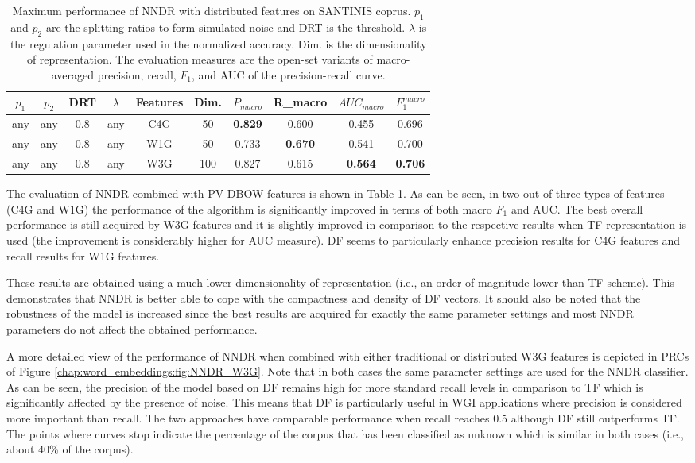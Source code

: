 \begin{table}
\center
\begin{tabular}{cccccccccc}
\hline
$p_{1}$ & $p_{2}$ & DRT & $\lambda$ & Features & Dim. & $P_{macro}$ & R_{macro} & $AUC_{macro}$ & $F_1^{macro}$ \\
\hline
any & any & 0.8 & any & C4G & 50 & \textbf{0.829} & 0.600 & 0.455 & 0.696 \\
any & any & 0.8 & any & W1G & 50 & 0.733 & \textbf{0.670} & 0.541 & 0.700 \\
any & any & 0.8 & any & W3G & 100 & 0.827 & 0.615 & \textbf{0.564} & \textbf{0.706} \\
\hline
\end{tabular}
\caption {Maximum performance of NNDR with distributed features on SANTINIS coprus. $p_{1}$ and $p_{2}$ are the splitting ratios to form simulated noise and DRT is the threshold. $\lambda$ is the regulation parameter used in the normalized accuracy. Dim. is the dimensionality of representation. The evaluation measures are the open-set variants of macro-averaged precision, recall, $F_1$, and AUC of the precision-recall curve.}
\label{chap:word_embeddings:tbl:NNDR_PVBOW}
\end{table}

The evaluation of NNDR combined with PV-DBOW features is shown in Table \ref{chap:word_embeddings:tbl:NNDR_PVBOW}. As can be seen, in two out of three types of features (C4G and W1G) the performance of the algorithm is significantly improved in terms of both macro $F_{1}$ and AUC. The best overall performance is still acquired by W3G features and it is slightly improved in comparison to the respective results when TF representation is used (the improvement is considerably higher for AUC measure). DF seems to particularly enhance precision results for C4G features and recall results for W1G features. 

These results are obtained using a much lower dimensionality of representation (i.e., an order of magnitude lower than TF scheme). This demonstrates that NNDR is better able to cope with the compactness and density of DF vectors. It should also be noted that the robustness of the model is increased since the best results are acquired for exactly the same parameter settings and most NNDR parameters do not affect the obtained performance. 

A more detailed view of the performance of NNDR when combined with either traditional or distributed W3G features is depicted in PRCs of Figure  \ref{chap:word_embeddings:fig:NNDR_W3G}. Note that in both cases the same parameter settings are used for the NNDR classifier.  As can be seen, the precision of the model based on DF remains high for more standard recall levels in comparison to TF which is significantly affected by the presence of noise. This means that DF is particularly useful in WGI applications where precision is considered more important than recall. The two approaches have comparable performance when recall reaches 0.5 although DF still outperforms TF. The points where curves stop indicate the percentage of the corpus that has been classified as unknown which is similar in both cases (i.e., about 40\% of the corpus).

